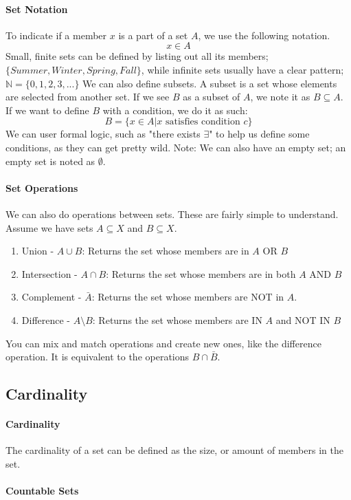 \paragraph{Set Notation} To indicate if a member $x$ is a part of a set $A$, we use the following notation. \[ x \in A\] Small, finite sets can be defined by listing out all its members; $\{Summer, Winter, Spring, Fall\}$, while infinite sets usually have a clear pattern; $\mathbb{N} = \{0, 1, 2, 3, ...\}$ We can also define subsets. A subset is a set whose elements are selected from another set. If we see $B$ as a subset of $A$, we note it as $B \subseteq A$. If we want to define $B$ with a condition, we do it as such: \[ B = \{ x \in A | x \text{ satisfies condition } c\}\] We can user formal logic, such as "there exists $\exists$" to help us define some conditions, as they can get pretty wild. Note: We can also have an empty set; an empty set is noted as $\emptyset$.
\paragraph{Set Operations} We can also do operations between sets. These are fairly simple to understand. Assume we have sets $A \subseteq X$ and $B \subseteq X$. 
\begin{enumerate}
	\item Union - $A \cup B$: Returns the set whose members are in $A$ OR $B$
	\item Intersection - $A \cap B$: Returns the set whose members are in both $A$ AND $B$
	\item Complement - $\bar{A}$: Returns the set whose members are NOT in $A$.
	\item Difference - $A \setminus B$: Returns the set whose members are IN $A$ and NOT IN $B$
\end{enumerate}
You can mix and match operations and create new ones, like the difference operation. It is equivalent to the operations $B \cap \bar{B}$.

\subsection{Cardinality} 
\paragraph{Cardinality} The cardinality of a set can be defined as the size, or amount of members in the set.
\paragraph{Countable Sets}
